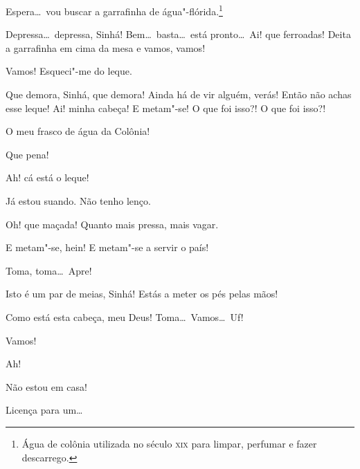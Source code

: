  Espera\ldots\ vou buscar a garrafinha de água"-flórida.\footnote{
Água de colônia utilizada no século \textsc{xix} para limpar, perfumar e fazer
descarrego.}

 Depressa\ldots\ depressa, Sinhá!  Bem\ldots\ basta\ldots\ está
pronto\ldots\ Ai! que ferroadas! Deita a garrafinha em cima da mesa e vamos,
vamos! 

 Vamos!  Esqueci"-me do leque.

  Que demora, Sinhá, que demora!
Ainda há de vir alguém, verás! 
Então não achas esse leque! Ai! minha cabeça! E metam"-se!
 O que foi
isso?! O que foi isso?! 

  O meu frasco de água da Colônia!

  Que pena!

  Ah! cá está o leque! 

 Já estou suando.  Não tenho
lenço.

 Oh! que maçada! Quanto mais pressa, mais vagar. 

 E metam"-se, hein! E metam"-se a servir o país!

  Toma, toma\ldots\ Apre! 

 Isto é um par de meias, Sinhá! Estás a meter os pés pelas
mãos! 

 Como está esta cabeça, meu Deus!  Toma\ldots\ Vamos\ldots\ Uf!

 Vamos! 

 Ah!

  Não estou em casa!

  Licença para
um\ldots


